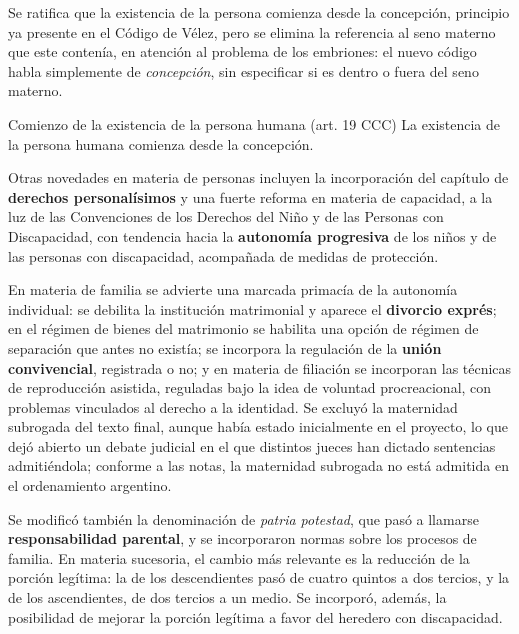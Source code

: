 \documentclass[12pt,oneside]{book}
\begin{document}
Se ratifica que la existencia de la persona comienza desde la concepción, principio ya presente en el Código de Vélez, pero se elimina la referencia al seno materno que este contenía, en atención al problema de los embriones: el nuevo código habla simplemente de \textit{concepción}, sin especificar si es dentro o fuera del seno materno.

\begin{definition}{Comienzo de la existencia de la persona humana (art. 19 CCC)}
La existencia de la persona humana comienza desde la concepción.
\end{definition}

Otras novedades en materia de personas incluyen la incorporación del capítulo de \textbf{derechos personalísimos} y una fuerte reforma en materia de capacidad, a la luz de las Convenciones de los Derechos del Niño y de las Personas con Discapacidad, con tendencia hacia la \textbf{autonomía progresiva} de los niños y de las personas con discapacidad, acompañada de medidas de protección.

En materia de familia se advierte una marcada primacía de la autonomía individual: se debilita la institución matrimonial y aparece el \textbf{divorcio exprés}; en el régimen de bienes del matrimonio se habilita una opción de régimen de separación que antes no existía; se incorpora la regulación de la \textbf{unión convivencial}, registrada o no; y en materia de filiación se incorporan las técnicas de reproducción asistida, reguladas bajo la idea de voluntad procreacional, con problemas vinculados al derecho a la identidad. Se excluyó la maternidad subrogada del texto final, aunque había estado inicialmente en el proyecto, lo que dejó abierto un debate judicial en el que distintos jueces han dictado sentencias admitiéndola; conforme a las notas, la maternidad subrogada no está admitida en el ordenamiento argentino.

Se modificó también la denominación de \textit{patria potestad}, que pasó a llamarse \textbf{responsabilidad parental}, y se incorporaron normas sobre los procesos de familia. En materia sucesoria, el cambio más relevante es la reducción de la porción legítima: la de los descendientes pasó de cuatro quintos a dos tercios, y la de los ascendientes, de dos tercios a un medio. Se incorporó, además, la posibilidad de mejorar la porción legítima a favor del heredero con discapacidad.
\end{document}
